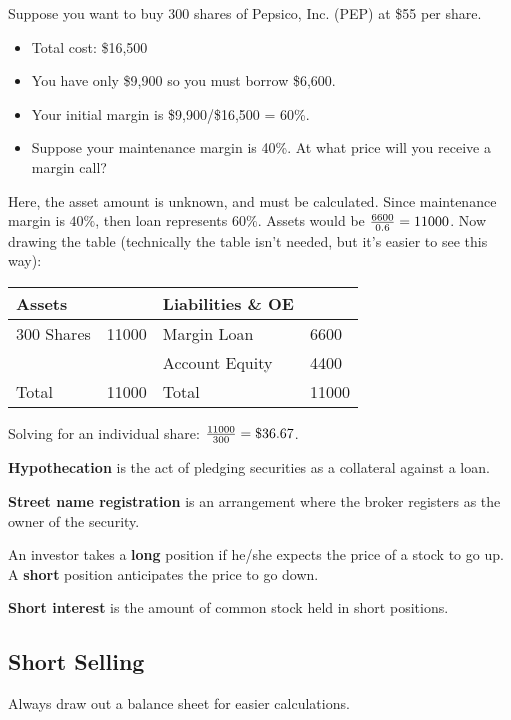 \documentclass[english, 12pt]{article}
\begin{document}
\begin{exmp}
Suppose you want to buy 300 shares of Pepsico, Inc. (PEP) at \$55 per share.
\begin{itemize}
\item Total cost: \$16,500
\item You have only \$9,900 so you must borrow \$6,600.
\item Your initial margin is \$9,900/\$16,500 = 60\%.
\item Suppose your maintenance margin is 40\%. At what price will you receive a margin call?
\end{itemize}
\begin{sol}
Here, the asset amount is unknown, and must be calculated. Since maintenance margin is $40\%$, then loan represents $60\%$. Assets would be $\frac{6600}{0.6} = 11000$. Now drawing the table (technically the table isn't needed, but it's easier to see this way):
\begin{center}
\begin{tabular}{|ll|ll|}
\hline
Assets & & Liabilities \& OE & \\
\hline
300 Shares &{\color{red} 11000} & Margin Loan & 6600 \\
& & Account Equity & {\color{red} 4400} \\
\hline
Total & {\color{red} 11000} & Total & {\color{red} 11000}\\
\hline
\end{tabular}
\end{center}
Solving for an individual share: $\frac{11000}{300} = \$36.67$.
\end{sol}
\end{exmp}
\begin{defn}
\textbf{Hypothecation} is the act of pledging securities as a collateral against a loan.
\end{defn}
\begin{defn}
\textbf{Street name registration} is an arrangement where the broker registers as the owner of the security.
\end{defn}
\begin{defn}
An investor takes a \textbf{long} position if he/she expects the price of a stock to go up. A \textbf{short} position anticipates the price to go down.
\end{defn}
\begin{defn}
\textbf{Short interest} is the amount of common stock held in short positions.
\end{defn}

\subsection{Short Selling}
\begin{qte}
Always draw out a balance sheet for easier calculations.
\end{qte}
\end{document}
